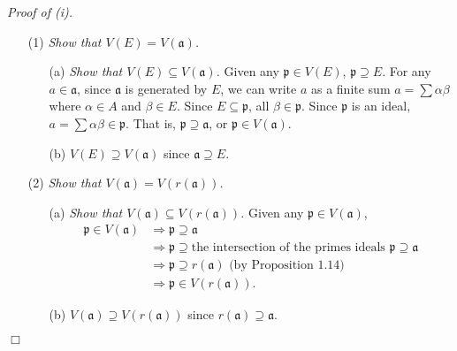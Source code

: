 \documentclass{article}
\begin{document}
\emph{Proof of (i).}
\begin{enumerate}
\item[(1)]
  \emph{Show that $V(E) = V(\mathfrak{a})$.}
    \begin{enumerate}
    \item[(a)]
      \emph{Show that $V(E) \subseteq V(\mathfrak{a})$.}
      Given any $\mathfrak{p} \in V(E)$, $\mathfrak{p} \supseteq E$.
      For any $a \in \mathfrak{a}$,
      since $\mathfrak{a}$ is generated by $E$,
      we can write $a$ as a finite sum
      $a = \sum \alpha \beta$ where $\alpha \in A$ and $\beta \in E$.
      Since $E \subseteq \mathfrak{p}$, all $\beta \in \mathfrak{p}$.
      Since $\mathfrak{p}$ is an ideal,
      $a = \sum \alpha \beta \in \mathfrak{p}$.
      That is, $\mathfrak{p} \supseteq \mathfrak{a}$,
      or $\mathfrak{p} \in V(\mathfrak{a})$.
    
    \item[(b)]
      \emph{$V(E) \supseteq V(\mathfrak{a})$} since $\mathfrak{a} \supseteq E$.
    \end{enumerate}

\item[(2)]
  \emph{Show that $V(\mathfrak{a}) = V(r(\mathfrak{a}))$.}
    \begin{enumerate}
    \item[(a)]
      \emph{Show that $V(\mathfrak{a}) \subseteq V(r(\mathfrak{a}))$.}
      Given any $\mathfrak{p} \in V(\mathfrak{a})$,
      \begin{align*}
        \mathfrak{p} \in V(\mathfrak{a})
        &\Longrightarrow \mathfrak{p} \supseteq \mathfrak{a} \\
        &\Longrightarrow \mathfrak{p} \supseteq \text{the intersection of the primes ideals }
        \mathfrak{p} \supseteq \mathfrak{a} \\
        &\Longrightarrow \mathfrak{p} \supseteq r(\mathfrak{a}) \text{ (by Proposition 1.14)}\\
        &\Longrightarrow \mathfrak{p} \in V(r(\mathfrak{a})).
      \end{align*}

    \item[(b)]
      \emph{$V(\mathfrak{a}) \supseteq V(r(\mathfrak{a}))$}
      since $r(\mathfrak{a}) \supseteq \mathfrak{a}$.
    \end{enumerate}
\end{enumerate}
$\Box$ \\
\end{document}
